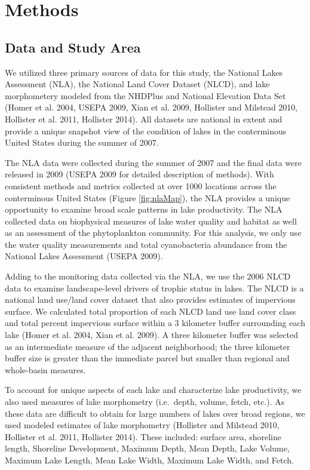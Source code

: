 \documentclass[11pt,]{article}
\begin{document}
\section{Methods}\label{methods}

\subsection{Data and Study Area}\label{data-and-study-area}

We utilized three primary sources of data for this study, the National
Lakes Assessment (NLA), the National Land Cover Dataset (NLCD), and lake
morphometery modeled from the NHDPlus and National Elevation Data Set
(Homer et al. 2004, USEPA 2009, Xian et al. 2009, Hollister and Milstead
2010, Hollister et al. 2011, Hollister 2014). All datasets are national
in extent and provide a unique snapshot view of the condition of lakes
in the conterminous United States during the summer of 2007.

The NLA data were collected during the summer of 2007 and the final data
were released in 2009 (USEPA 2009 for detailed description of methods).
With consistent methods and metrics collected at over 1000 locations
across the conterminous United States (Figure \ref{fig:nlaMap}), the NLA
provides a unique opportunity to examine broad scale patterns in lake
productivity. The NLA collected data on biophysical measures of lake
water quality and habitat as well as an assessment of the phytoplankton
community. For this analysis, we only use the water quality measurements
and total cyanobacteria abundance from the National Lakes Assessment
(USEPA 2009).

Adding to the monitoring data collected via the NLA, we use the 2006
NLCD data to examine landscape-level drivers of trophic status in lakes.
The NLCD is a national land use/land cover dataset that also provides
estimates of impervious surface. We calculated total proportion of each
NLCD land use land cover class and total percent impervious surface
within a 3 kilometer buffer surrounding each lake (Homer et al. 2004,
Xian et al. 2009). A three kilometer buffer was selected as an
intermediate measure of the adjacent neighborhood; the three kilometer
buffer size is greater than the immediate parcel but smaller than
regional and whole-basin measures.

To account for unique aspects of each lake and characterize lake
productivity, we also used measures of lake morphometry (i.e.~depth,
volume, fetch, etc.). As these data are difficult to obtain for large
numbers of lakes over broad regions, we used modeled estimates of lake
morphometry (Hollister and Milstead 2010, Hollister et al. 2011,
Hollister 2014). These included: surface area, shoreline length,
Shoreline Development, Maximum Depth, Mean Depth, Lake Volume, Maximum
Lake Length, Mean Lake Width, Maximum Lake Width, and Fetch.
\end{document}
